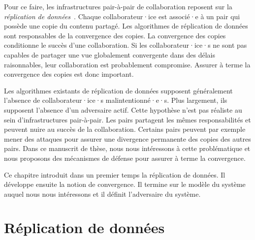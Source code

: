 Pour ce faire, les infrastructures pair-à-pair de collaboration reposent sur la \emph{réplication de données}~\autocite{saito_2005_optimisticreplication}.
Chaque collaborateur·ice est associé·e à un pair qui possède une copie du contenu partagé.
Les algorithmes de réplication de données sont responsables de la convergence des copies.
La convergence des copies conditionne le succès d'une collaboration.
Si les collaborateur·ice·s ne sont pas capables de partager une vue globalement convergente dans des délais raisonnables, leur collaboration est probablement compromise.
Assurer à terme la convergence des copies est donc important.

Les algorithmes existants de réplication de données supposent généralement l'absence de collaborateur·ice·s malintentionné·e·s.
Plus largement, ils supposent l'absence d'un adversaire actif.
Cette hypothèse n'est pas réaliste au sein d'infrastructures pair-à-pair.
Les pairs partagent les mêmes responsabilités et peuvent nuire au succès de la collaboration.
Certains pairs peuvent par exemple mener des attaques pour assurer une divergence permanente des copies des autres pairs.
Dans ce manuscrit de thèse, nous nous intéressons à cette problématique et nous proposons des mécanismes de défense pour assurer à terme la convergence.

Ce chapitre introduit dans un premier temps la réplication de données. Il développe ensuite la notion de convergence.
Il termine sur le modèle du système auquel nous nous intéressons et il définit l'adversaire du système.

\section{Réplication de données}\label{sec:optimistic-replication}

